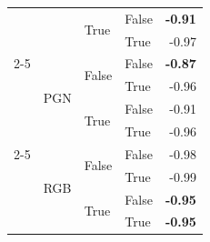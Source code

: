 \documentclass{article}
\begin{document}
\begin{table}
\begin{center}
{\begin{tabular}{@{}llllr@{}}
                                                &                           & \multirow[c]{2}{*}{True}  & False                     & \textbf{-0.91} \\
                                                &                           &                           & True                      & -0.97 \\
    \cmidrule{2-5}
                                                & \multirow[c]{4}{*}{PGN}   & \multirow[c]{2}{*}{False} & False                     & \textbf{-0.87} \\
                                                &                           &                           & True                      & -0.96 \\
                                                &                           & \multirow[c]{2}{*}{True}  & False                     & -0.91 \\
                                                &                           &                           & True                      & -0.96 \\
    \cmidrule{2-5}
                                                & \multirow[c]{4}{*}{RGB}   & \multirow[c]{2}{*}{False} & False                     & -0.98 \\
                                                &                           &                           & True                      & -0.99 \\
                                                &                           & \multirow[c]{2}{*}{True}  & False                     & \textbf{-0.95} \\
                                                &                           &                           & True                      & \textbf{-0.95} \\
   \bottomrule
\end{tabular}
}
    \end{center}
    \label{tab:chess-ablation-gemini}
\end{table}
\end{document}
